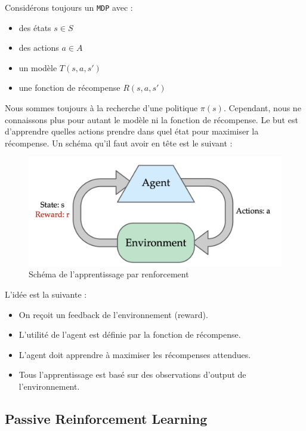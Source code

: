 \noindent Considérons toujours un \texttt{MDP} avec :
\begin{itemize}[label=\textbullet]
    \item des états $s\in S$
    \item des actions $a\in A$
    \item un modèle $T(s,a,s')$
    \item une fonction de récompense $R(s,a,s')$
\end{itemize}
Nous sommes toujours à la recherche d'une politique $\pi(s)$. Cependant, nous ne connaissons plus pour autant le modèle ni la
fonction de récompense. Le but est d'apprendre quelles actions prendre dans quel état pour maximiser la récompense. Un schéma
qu'il faut avoir en tête est le suivant :
\begin{figure}[H]
    \centering
    \includegraphics[width=0.5\linewidth]{pictures/rl_scheme.png}
    \caption{Schéma de l'apprentissage par renforcement}
    \label{fig:rl_scheme}
\end{figure}
\noindent L'idée est la suivante :
\begin{itemize}[label=\textbullet]
    \item On reçoit un feedback de l'environnement (reward).
    \item L'utilité de l'agent est définie par la fonction de récompense.
    \item L'agent doit apprendre à maximiser les récompenses attendues.
    \item Tous l'apprentissage est basé sur des observations d'output de l'environnement.
\end{itemize}

\subsection{Passive Reinforcement Learning} %
